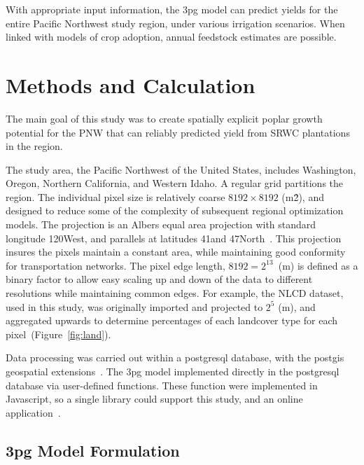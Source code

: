 \documentclass[preprint,12pt]{elsarticle}
\begin{document}
With appropriate input information, the \ac{3pg} model can predict
yields for the entire Pacific Northwest study region, under various
irrigation scenarios.  When linked with models of crop adoption,
annual feedstock estimates are possible.

\section{Methods and Calculation}

The main goal of this study was to create spatially explicit poplar
growth potential for the \ac{PNW} that can reliably predicted yield from \ac{SRWC}
plantations in the region.

The study area, the Pacific Northwest of the United States,
includes Washington, Oregon, Northern California, and Western
Idaho.  A regular grid partitions the region.  The individual pixel size is
relatively coarse $8192 \times 8192$ (m\^2), and designed to reduce
some of the complexity of subsequent regional optimization models.
The projection is an Albers equal area projection with standard
longitude 120\degree West, and parallels at latitudes 41\degree and
47\degree North~\cite{Butler}. This projection insures the pixels
maintain a constant area, while maintaining good conformity for
transportation networks.  The pixel edge length, $8192 = 2^{13}$~(m)
is defined as a binary factor to allow easy scaling up and down of the
data to different resolutions while maintaining common edges.  For
example, the \ac{NLCD} dataset, used in this study, was originally
imported and projected to $2^5$ (m), and aggregated upwards to
determine percentages of each landcover type for each
pixel~(Figure~\ref{fig:land}).

Data processing was carried out within a postgresql database, with the
postgis geospatial extensions~\cite{pgsql,Holl2009,postgis}.  The
\ac{3pg} model implemented directly in the postgresql database via
user-defined functions.  These function were implemented in
Javascript, so a single library could support this study, and an
online application~\cite{Prilepova2014}.

\subsection{\acs{3pg} Model Formulation}
\label{sec:3pg}
\end{document}
